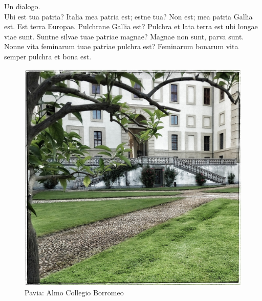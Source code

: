 \documentclass[nols]{tufte-handout}
\begin{document}
 Un dialogo.
\\
Ubi est tua patria? Italia mea patria est; estne tua? Non est; mea patria Gallia est. Est terra Europae. 
Pulchrane Gallia est? Pulchra et lata terra est ubi longae viae sunt. Suntne silvae tuae patriae magnae?
Magnae non sunt, parva sunt. Nonne vita feminarum tuae patriae pulchra est? 
Feminarum bonarum vita semper pulchra et bona est.

\begin{figure}[!b]
  \includegraphics[width=0.8\linewidth]{thumb-lesson_III.jpeg}
  \caption{Pavia: Almo Collegio Borromeo}
  \label{fig:textfig}
\end{figure}

 


\end{document}
